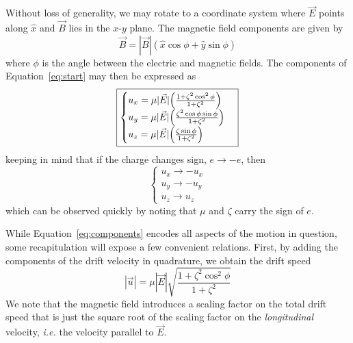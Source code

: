 \documentclass[twoside]{article}
\begin{document}
\begin{multicols}{2}
 Without loss of generality, we may rotate to a coordinate system where $\vec{E}$ points along $\hat{x}$ and $\vec{B}$ lies in the $x$-$y$ plane. The magnetic field components are given by
\begin{equation}
\vec{B} =  | \vec{B} | ( \hat{x} \cos \phi + \hat{y} \sin \phi)
\end{equation}
where $\phi$ is the angle between the electric and magnetic fields. The components of Equation~\ref{eq:start} may then be expressed as \newpage
\begin{equation}
\boxed{
\label{eq:components}
 \begin{cases}
               u_x =  \mu |\vec{E}| \Big(\frac{1 + \zeta^2 \cos^2 \phi}{1 + \zeta^2}\Big) \\ 
               u_y =  \mu |\vec{E}| \Big(\frac{\zeta^2 \cos \phi \sin \phi}{1 + \zeta^2}\Big) \\ 
               u_z =  \mu |\vec{E}| \Big(\frac{\zeta \sin \phi}{1 + \zeta^2}\Big)
            \end{cases} 
            }
\end{equation}
keeping in mind that if the charge changes sign, $e \to -e$, then
\begin{equation}
 \begin{cases}
               u_x \to - u_x\\ 
               u_y \to  - u_y\\ 
               u_z \to  u_z
            \end{cases} 
\end{equation}
which can be observed quickly by noting that $\mu$ and $\zeta$ carry the sign of $e$.

While Equation~\ref{eq:components} encodes all aspects of the motion in question, some recapitulation will expose a few convenient relations.
First, by adding the components of the drift velocity in quadrature, we obtain the drift speed
\begin{equation}
\label{eq:speed}
|\vec{u}| = \mu |\vec{E}| \sqrt{ \frac{1 + \zeta^2 \cos^2 \phi }{1 + \zeta^2}}
\end{equation}
We note that the magnetic field introduces a scaling factor on the total drift speed that is just the square root of the scaling factor on the \emph{longitudinal} velocity, \emph{i.e.} the velocity parallel to $\vec{E}$.


\end{multicols}
\end{document}
